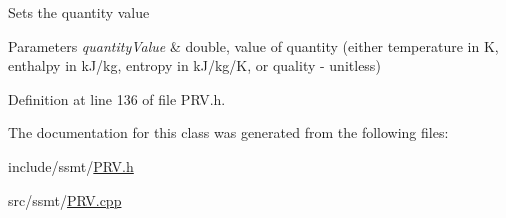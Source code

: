 Sets the quantity value


\begin{DoxyParams}{Parameters}
{\em quantity\+Value} & double, value of quantity (either temperature in K, enthalpy in k\+J/kg, entropy in k\+J/kg/K, or quality -\/ unitless) \\
\hline
\end{DoxyParams}


Definition at line 136 of file P\+R\+V.\+h.



The documentation for this class was generated from the following files\+:\begin{DoxyCompactItemize}
\item 
include/ssmt/\hyperlink{_p_r_v_8h}{P\+R\+V.\+h}\item 
src/ssmt/\hyperlink{_p_r_v_8cpp}{P\+R\+V.\+cpp}\end{DoxyCompactItemize}
